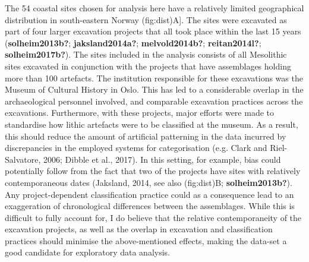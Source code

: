 \documentclass[
]{article}
\begin{document}
The 54 coastal sites chosen for analysis here have a relatively limited geographical distribution in south-eastern Norway (fig:dist)A{]}. The sites were excavated as part of four larger excavation projects that all took place within the last 15 years (\textbf{solheim2013b?}; \textbf{jaksland2014a?}; \textbf{melvold2014b?}; \textbf{reitan2014l?}; \textbf{solheim2017b?}). The sites included in the analysis consists of all Mesolithic sites excavated in conjunction with the projects that have assemblages holding more than 100 artefacts. The institution responsible for these excavations was the Museum of Cultural History in Oslo. This has led to a considerable overlap in the archaeological personnel involved, and comparable excavation practices across the excavations. Furthermore, with these projects, major efforts were made to standardise how lithic artefacts were to be classified at the museum. As a result, this should reduce the amount of artificial patterning in the data incurred by discrepancies in the employed systems for categorisation (e.g. Clark and Riel-Salvatore, 2006; Dibble et al., 2017). In this setting, for example, bias could potentially follow from the fact that two of the projects have sites with relatively contemporaneous dates (Jaksland, 2014, see also (fig:dist)B; \textbf{solheim2013b?}). Any project-dependent classification practice could as a consequence lead to an exaggeration of chronological differences between the assemblages. While this is difficult to fully account for, I do believe that the relative contemporaneity of the excavation projects, as well as the overlap in excavation and classification practices should minimise the above-mentioned effects, making the data-set a good candidate for exploratory data analysis.
\end{document}
